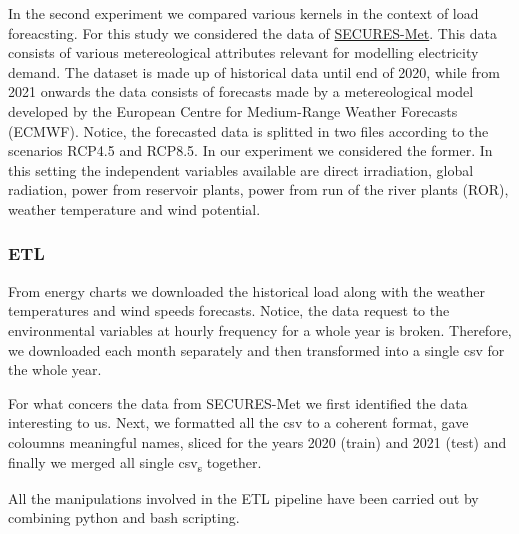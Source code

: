 In the second experiment we compared various kernels in the context of load foreacsting.
For this study we considered the data of \href{https://zenodo.org/records/7907883}{SECURES-Met}. This data consists of various metereological attributes relevant for modelling electricity demand. The dataset is made up of historical data until end of 2020, while from 2021 onwards the data consists of forecasts made by a metereological model developed by the European Centre for Medium-Range Weather Forecasts (ECMWF). Notice, the forecasted data is splitted in two files according to the scenarios RCP4.5 and RCP8.5. In our experiment we considered the former. 
In this setting the independent variables available are 
direct irradiation, global radiation, power from reservoir plants, power from run of the river plants (ROR), weather temperature and wind potential.

\subsubsection{ETL}
From energy charts we downloaded the historical load along with the weather temperatures and wind speeds forecasts. Notice, the data request to the environmental variables at hourly frequency for a whole year is broken. Therefore, we downloaded each month separately and then transformed into a single csv for the whole year.

For what concers the data from SECURES-Met we first identified the data interesting to us. Next, we formatted all the csv to a coherent format, gave coloumns meaningful names, sliced for the years 2020 (train) and 2021 (test) and finally we merged all single csv\textsubscript{s} together.

All the manipulations involved in the ETL pipeline have been carried out by combining python and bash scripting. 

